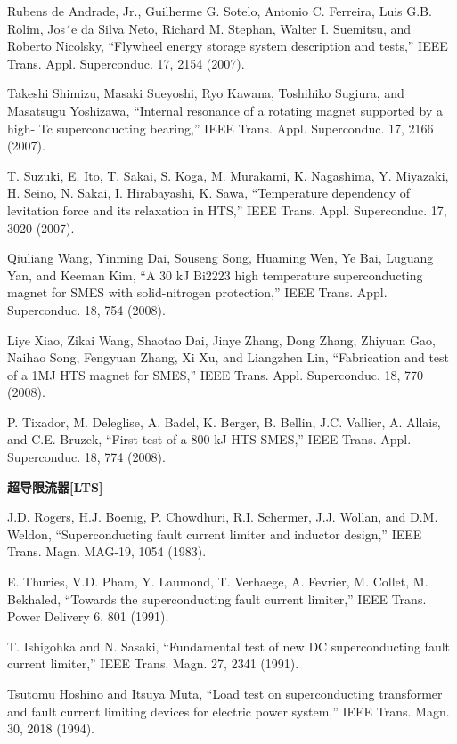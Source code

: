 \noindent [9.106] Rubens de Andrade, Jr., Guilherme G. Sotelo, Antonio C. Ferreira, Luis G.B.
Rolim, Jos´e da Silva Neto, Richard M. Stephan, Walter I. Suemitsu, and Roberto
Nicolsky, ``Flywheel energy storage system description and tests,” IEEE Trans.
Appl. Superconduc. 17, 2154 (2007).

\noindent [9.107] Takeshi Shimizu, Masaki Sueyoshi, Ryo Kawana, Toshihiko Sugiura, and Masatsugu
Yoshizawa, ``Internal resonance of a rotating magnet supported by a high-
Tc superconducting bearing,” IEEE Trans. Appl. Superconduc. 17, 2166 (2007).

\noindent [9.108] T. Suzuki, E. Ito, T. Sakai, S. Koga, M. Murakami, K. Nagashima, Y. Miyazaki,
H. Seino, N. Sakai, I. Hirabayashi, K. Sawa, ``Temperature dependency of levitation
force and its relaxation in HTS,” IEEE Trans. Appl. Superconduc. 17, 3020
(2007).

\noindent [9.109] Qiuliang Wang, Yinming Dai, Souseng Song, Huaming Wen, Ye Bai, Luguang
Yan, and Keeman Kim, ``A 30 kJ Bi2223 high temperature superconducting magnet
for SMES with solid-nitrogen protection,” IEEE Trans. Appl. Superconduc.
18, 754 (2008).

\noindent [9.110] Liye Xiao, Zikai Wang, Shaotao Dai, Jinye Zhang, Dong Zhang, Zhiyuan Gao,
Naihao Song, Fengyuan Zhang, Xi Xu, and Liangzhen Lin, ``Fabrication and test
of a 1MJ HTS magnet for SMES,” IEEE Trans. Appl. Superconduc. 18, 770
(2008).

\noindent [9.111] P. Tixador, M. Deleglise, A. Badel, K. Berger, B. Bellin, J.C. Vallier, A. Allais, and
C.E. Bruzek, ``First test of a 800 kJ HTS SMES,” IEEE Trans. Appl. Superconduc.
18, 774 (2008).

\noindent \textbf{超导限流器[LTS] }

\noindent [9.112] J.D. Rogers, H.J. Boenig, P. Chowdhuri, R.I. Schermer, J.J. Wollan, and D.M.
Weldon, ``Superconducting fault current limiter and inductor design,” IEEE
Trans. Magn. MAG-19, 1054 (1983).

\noindent [9.113] E. Thuries, V.D. Pham, Y. Laumond, T. Verhaege, A. Fevrier, M. Collet, M.
Bekhaled, ``Towards the superconducting fault current limiter,” IEEE Trans.
Power Delivery 6, 801 (1991).

\noindent [9.114] T. Ishigohka and N. Sasaki, ``Fundamental test of new DC superconducting fault
current limiter,” IEEE Trans. Magn. 27, 2341 (1991).

\noindent [9.115] Tsutomu Hoshino and Itsuya Muta, ``Load test on superconducting transformer
and fault current limiting devices for electric power system,” IEEE Trans. Magn.
30, 2018 (1994).

